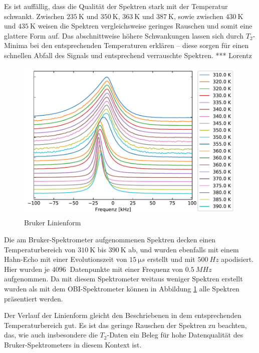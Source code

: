 Es ist auffällig, dass die Qualität der Spektren stark mit der Temperatur schwankt. Zwischen $\SI{235}{\kelvin}$ und $\SI{350}{\kelvin}$, $\SI{363}{\kelvin}$ und $\SI{387}{\kelvin}$, sowie zwischen $\SI{430}{\kelvin}$ und $\SI{435}{\kelvin}$ weisen die Spektren vergleichsweise geringes Rauschen und somit eine glattere Form auf. Das abschnittweise höhere Schwankungen lassen sich durch $T_2$-Minima bei den entsprechenden Temperaturen erklären -- diese sorgen für einen schnellen Abfall des Signals und entsprechend verrauschte Spektren. *** Lorentz

\begin{figure}
	\begin{center}
		\includegraphics[width=\textwidth]{graphics/plot/bruker_lineshape.pdf}
	\end{center}
	\caption{Bruker Linienform} \label{fig:res:bruker_linienform}
\end{figure}
Die am Bruker-Spektrometer aufgenommenen Spektren decken einen Temperaturbereich von $\SI{310}{\kelvin}$ bis $\SI{390}{\kelvin}$ ab, und wurden ebenfalls mit einem Hahn-Echo mit einer Evolutionszeit von $\SI{15}{\micro s}$ erstellt und mit $\SI{500}{Hz}$ apodisiert. Hier wurden je $\SI{4096}{}$ Datenpunkte mit einer Frequenz von $\SI{0.5}{MHz}$ aufgenommen. Da mit diesem Spektrometer weitaus weniger Spektren erstellt wurden als mit dem OBI-Spektrometer können in Abbildung \ref{fig:res:bruker_linienform} alle Spektren präsentiert werden.

Der Verlauf der Linienform gleicht den Beschriebenen in dem entsprechenden Temperaturbereich gut. Es ist das geringe Rauschen der Spektren zu beachten, das, wie auch insbesondere die $T_2$-Daten ein Beleg für hohe Datenqualität des Bruker-Spektrometers in diesem Kontext ist.

